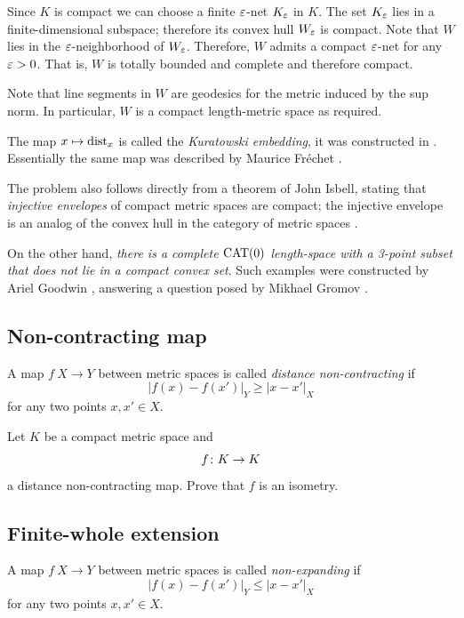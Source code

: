Since $K$ is compact we can choose a finite $\varepsilon$-net $K_\varepsilon$ in $K$.
The set $K_\varepsilon$ lies in a finite-dimensional subspace;
therefore its convex hull $W_\varepsilon$ is compact.
Note that $W$ lies in the $\varepsilon$-neighborhood of $W_\varepsilon$.
Therefore, $W$ admits a compact $\varepsilon$-net for any $\varepsilon>0$.
That is, $W$ is totally bounded and complete and therefore compact.

Note that line segments in $W$ are geodesics for the metric induced by the sup norm.
In particular, $W$ is a compact length-metric space as required.
\qeds

The map $x\mapsto \operatorname{\rm dist}\nolimits_x$ is called the \emph{Kuratowski embedding}, it was constructed in \cite{kuratowski}.
Essentially the same map was described by Maurice Fr\'echet \cite{frechet}.

The problem also follows directly from a theorem of John Isbell, stating that \emph{injective envelopes} of compact metric spaces are compact;
the injective envelope is an analog of the convex hull in the category of metric spaces \cite[see 2.11 in][]{isbell}.

On the other hand, \emph{there is a complete $\operatorname{\rm CAT}\nolimits(0)$ length-space with a 3-point subset that does not lie in a compact convex set}.
Such examples were constructed by Ariel Goodwin \cite{goodwin2026, lytchak2026}, answering a question posed by Mikhael Gromov \cite[6.B$_1$(f)]{gromov-asymptotic}.

\subsection*{Non-contracting map\easy}
\label{Noncontracting map}

A map $f\: X\to Y$ between metric spaces is called \emph{distance non-contracting} if
\[|f(x)-f(x')|_Y\ge |x-x'|_X\]
for any two points $x,x'\in X$.

\begin{pr}
Let $K$ be a compact metric space and
\[f\:K\z\to K\] 
a distance non-contracting map.
Prove that $f$ is an isometry.
\end{pr}

\subsection*{Finite-whole extension}
\label{Finite-whole extension}

A map $f\: X\to Y$ between metric spaces is called \emph{non-expanding} if
\[|f(x)-f(x')|_Y\le |x-x'|_X\]
for any two points $x,x'\in X$.

